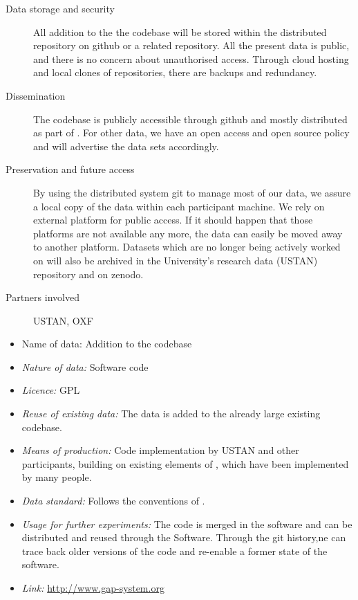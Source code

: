 \documentclass{deliverablereport}
\begin{document}
\begin{description}
\item[Data storage and security] All addition to the the \GAP codebase will be stored within the distributed \GAP repository on github or a related repository. All the present data is public, and there is no concern about unauthorised access. Through cloud hosting and local clones of repositories, there are backups and redundancy.\label{GAPsec}
\item[Dissemination] The \GAP codebase is publicly accessible through github and mostly distributed as part of \GAP. For other data, we have an open access and open source policy and will advertise the data sets accordingly.
\label{GAPdiss}

\item[Preservation and future access] By using the distributed system git to manage most of our data, we assure a local copy of the data within each participant machine. We rely on external platform for public access. If it should happen that those platforms are not available any more, the data can easily be moved away to another platform. Datasets which are no longer being actively worked on will also be archived in the University's  research data (USTAN) repository and on zenodo.\label{Sagepres}
\item[Partners involved] USTAN, OXF
\end{description}


\begin{itemize}


\item{Name of data:} Addition to the \GAP codebase
\item\textit{Nature of data:} Software code
\item\textit{Licence:} GPL
\item\textit{Reuse of existing data:} The data is added to the already large existing \GAP codebase.
\item\textit{Means of production:} Code implementation by USTAN and other participants, building on existing elements of \GAP, which have been implemented by many people.
\item\textit{Data standard:} Follows the conventions of \GAP.
\item\textit{Usage for further experiments:} The code is merged in the software and can be distributed and reused through the Software. Through the git history,ne can trace back older versions of the code and re-enable a former state of the software.
\item\textit{Link:} \href{http://www.gap-system.org}{http://www.gap-system.org}
\end{itemize}
\end{document}
